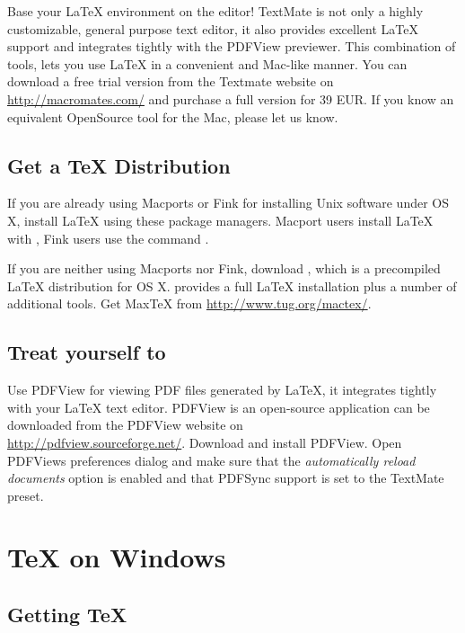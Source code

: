 Base your LaTeX environment on the  editor! TextMate is not
only a highly customizable, general purpose text editor, it also provides
excellent LaTeX support and integrates tightly with the PDFView previewer.
This combination of tools, lets you use LaTeX in a convenient and Mac-like
manner. You can download a free trial version from the Textmate website on
\url{http://macromates.com/} and purchase a full version for 39 EUR. If you
know an equivalent OpenSource tool for the Mac, please let us know.

\subsection{Get a \TeX{} Distribution}

If you are already using Macports or Fink for installing Unix software under
OS X, install LaTeX using these package managers. Macport users install
LaTeX with ,
Fink users use the command .

If you are neither using Macports nor Fink, download , which is a
precompiled LaTeX distribution for OS X.  provides a full LaTeX
installation plus a number of additional tools. Get MaxTeX from
\url{http://www.tug.org/mactex/}.

\subsection{Treat yourself to }

Use PDFView for viewing PDF files generated by LaTeX, it integrates tightly
with your LaTeX text editor. PDFView is an open-source application can be
downloaded from the PDFView website on\\
\url{http://pdfview.sourceforge.net/}. Download and install PDFView. Open
PDFViews preferences dialog and make sure that the \emph{automatically reload
documents} option is enabled and that PDFSync support is set to the TextMate
preset.

\section{\TeX{} on Windows}

\subsection{Getting \TeX{}}

